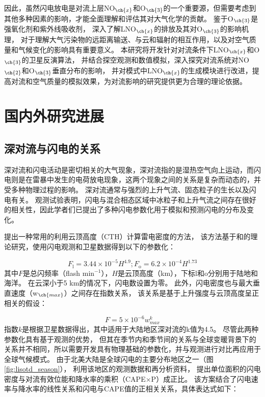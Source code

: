 因此，虽然闪电放电是对流上层NO$_{\ch{x}}$和O$_{\ch{3}}$的一个重要源，但需要考虑到其他多种因素的影响，才能全面理解和评估其对大气化学的贡献。
鉴于O$_{\ch{3}}$是强氧化剂和紫外线吸收剂\citep{Myhre.2013}，
深入了解LNO$_{\ch{x}}$的排放及其对O$_{\ch{3}}$的影响机理，
对于理解大气污染物的远距离输送、与云和辐射的相互作用，以及对空气质量和气候变化的影响具有重要意义。
本研究将开发针对对流条件下LNO$_{\ch{x}}$和O$_{\ch{3}}$的卫星反演算法，
并结合探空观测和数值模拟，深入探究对流系统对NO$_{\ch{2}}$和O$_{\ch{3}}$垂直分布的影响，
并对模式中LNO$_{\ch{x}}$的生成模块进行改进，提高对流和空气质量的模拟效果，为对流影响的研究提供更为合理的理论依据。


\section{国内外研究进展}

\subsection{深对流与闪电的关系} \label{sec:lightning_convection}

深对流和闪电活动是密切相关的大气现象，深对流指的是湿热空气向上运动，而闪电则是在雷暴中发生的电荷放电现象，这两个现象之间的关系是复杂而动态的，并受多种物理过程的影响。
深对流通常与强烈的上升气流、固态粒子的生长以及闪电有关。
观测试验表明，闪电与混合相态区域中冰粒子和上升气流之间存在很好的相关性\citep{Williams.1989,Deierling.2008c,Deierling.2008d}，因此学者们已提出了多种闪电参数化用于模拟和预测闪电的分布及变化。

\citet{Price.1992}提出一种常用的利用云顶高度（CTH）计算雷电密度的方法，
该方法基于\citet{Vonnegut.1963}和\citet{Williams.1985}的理论研究，使用闪电观测和卫星数据得到以下的参数化：

\begin{equation} \label{eq:ltng_cth}
F_\mathrm{l} = 3.44\times10^{-5}H^{4.9};
F_\mathrm{o} = 6.2\times10^{-4}H^{1.73}
\end{equation}
其中$F$是总闪频率（flash min$^{-1}$），$H$是云顶高度（km），下标l和o分别用于陆地和海洋。
在云深小于5 km的情况下，闪电数设置为零。
此外，闪电密度也与最大垂直速度（w$_{\ch{max}}$）之间存在指数关系，
该关系是基于上升强度与云顶高度呈正相关的假设：

\begin{equation} \label{eq:ltng_w}
F = 5\times10^{-6}w^{k}_{max}
\end{equation}
指数$k$是根据卫星数据得出，其中适用于大陆地区深对流的k值为4.5\citep{Price.1992}。
尽管此两种参数化具有基于观测的优势，
但其在季节内和季节间的关系与全球变暖背景下的关系并不相同，所以需要开发具有物理基础的参数化，并与观测进行对比再应用于全球气候模式。
由于北美大陆是全球闪电的主要分布地区之一（图\ref{fig:lisotd_season}），
\citet{Romps.2014}利用该地区的观测数据和再分析资料，
提出单位面积的闪电密度与对流有效位能和降水率的乘积（CAPE$\times$P）成正比。
该方案结合了闪电速率与降水率的线性关系\citep{Battan.1965,Petersen.1998,Tapia.1998}和闪电与CAPE值的正相关关系\citep{Williams.2005a}，具体表达式如下：

